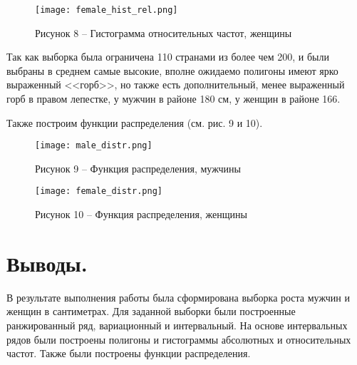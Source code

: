 \begin{figure}[H]
    \centering
    \texttt{[image: female\_hist\_rel.png]}
    \caption*{Рисунок 8 -- Гистограмма относительных частот, женщины}
    \label{fig:8}
\end{figure}

Так как выборка была ограничена 110 странами из более чем 200, и были выбраны
в среднем самые высокие, вполне ожидаемо полигоны имеют ярко выраженный <<горб>>,
но также есть дополнительный, менее выраженный горб в правом лепестке, у мужчин в районе 180 см, у женщин в районе 166.

Также построим функции распределения (см. рис. 9 и 10).

\begin{figure}[H]
    \centering
    \texttt{[image: male\_distr.png]}
    \caption*{Рисунок 9 -- Функция распределения, мужчины}
    \label{fig:9}
\end{figure}

\begin{figure}[H]
    \centering
    \texttt{[image: female\_distr.png]}
    \caption*{Рисунок 10 -- Функция распределения, женщины}
    \label{fig:10}
\end{figure}

\section*{Выводы.}
В результате выполнения работы была сформирована выборка роста мужчин и женщин
в сантиметрах.
Для заданной выборки были построенные ранжированный ряд, вариационный и интервальный.
На основе интервальных рядов были построены полигоны и гистограммы абсолютных и относительных
частот.
Также были построены функции распределения.
